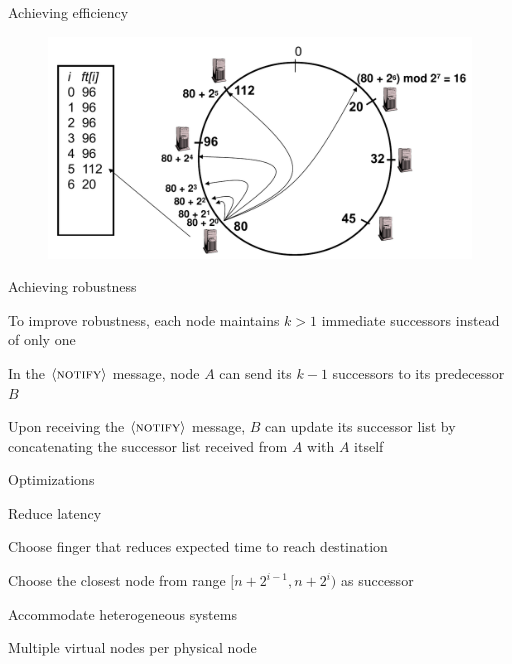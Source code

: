 \begin{frame}{Achieving efficiency}
	
\begin{figure}
	\includegraphics[width=\textwidth]{figs/10/fingers}
\end{figure}	
	
\end{frame}

\begin{frame}{Achieving robustness}
	
\BI
\item To improve robustness, each node maintains $k > 1$ immediate successors instead of only one
\item In the $\langle \textsc{notify} \rangle$ message, node $A$ can send its $k-1$ successors to its predecessor $B$
\item Upon receiving the $\langle \textsc{notify} \rangle$ message, $B$ can update its successor list 
by concatenating the successor list received from $A$ with $A$ itself
\EI
\end{frame}

\begin{frame}{Optimizations}
	
\BIL
\item \alert{Reduce latency}
	\BI
	\item Choose finger that reduces expected time to reach destination
	\item Choose the closest node from range $[n+2^{i-1},n+2^i)$ as successor
	\EI
\item \alert{Accommodate heterogeneous systems}
	\BI
	\item Multiple virtual nodes per physical node
	\EI
\EIL

\end{frame}

